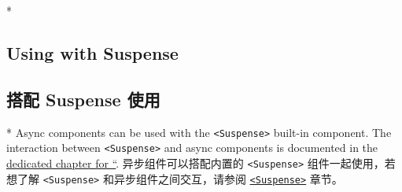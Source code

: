 \begin{paracol}{2}
 
\switchcolumn[0]*%
\subsection{Using with Suspense}
\switchcolumn
\subsection{搭配 Suspense 使用}
\switchcolumn[0]*%
Async components can be used with the
\texttt{\textless{}Suspense\textgreater{}} built-in component. The
interaction between \texttt{\textless{}Suspense\textgreater{}} and async
components is documented in the
\href{https://vuejs.org/guide/built-ins/suspense.html}{dedicated chapter
for ``}.
\switchcolumn
异步组件可以搭配内置的 \texttt{\textless{}Suspense\textgreater{}}
组件一起使用，若想了解 \texttt{\textless{}Suspense\textgreater{}}
和异步组件之间交互，请参阅
\href{https://cn.vuejs.org/guide/built-ins/suspense.html}{{\tt <Suspense>}} 章节。
\end{paracol}
 